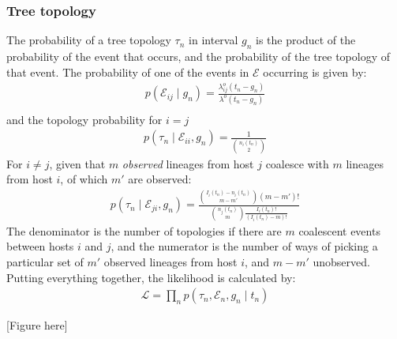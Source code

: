 \documentclass[]{report}
\begin{document}
\subsubsection{Tree topology}
The probability of a tree topology $\tau_n$ in interval $g_n$ is the product of the probability of the event that occurs, and the probability of the tree topology of that event.
The probability of one of the events in $\mathcal{E}$ occurring is given by:
\begin{eqnarray}
p(\mathcal{E}_{ij} \mid g_n) = \frac{\lambda_{ij}^o(t_n - g_n)}{\lambda^o(t_n - g_n)}  \nonumber \\
\end{eqnarray}
and the topology probability for  $i=j$
\begin{eqnarray}
p(\tau_n \mid \mathcal{E}_{ii}, g_n) = \frac{1}{{n_i (t_n)\choose 2}} 
\end{eqnarray}
For $i \neq j$, given that $m$ {\it observed} lineages from host $j$ coalesce with $m$ lineages from host $i$, of which $m'$ are observed:
\begin{eqnarray}
p(\tau_n \mid \mathcal{E}_{ji}, g_n) = \frac{ {I_i(t_n) - n_i(t_n) \choose m - m'}(m-m')!}{{n_j (t_n)\choose m} \frac{I_i(t_n)!}{(I_i(t_n) - m)!}} 
\end{eqnarray}
The denominator is the number of topologies if there are $m$ coalescent events between hosts $i$ and $j$, and the numerator is the number of ways of picking a particular set of $m'$ observed lineages from host $i$, and $m-m'$ unobserved. 
Putting everything together, the likelihood is calculated by:
\begin{eqnarray}
\mathcal{L} = \prod_n p(\tau_n, \mathcal{E}_n, g_n \mid t_n)
\end{eqnarray}

[Figure here]
\end{document}
